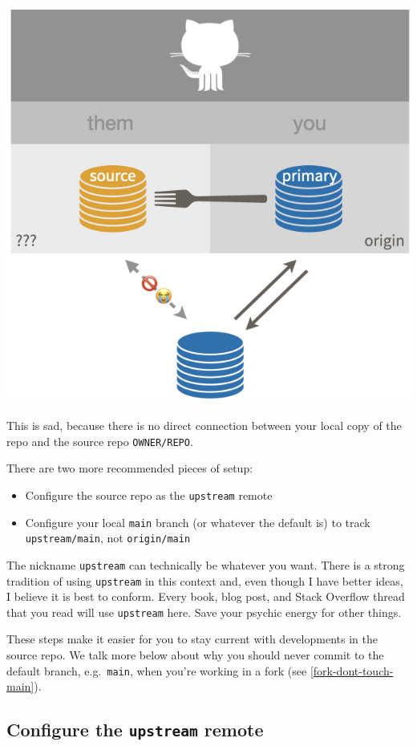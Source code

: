 \documentclass[
]{book}
\providecommand{\tightlist}{%
  \setlength{\itemsep}{0pt}\setlength{\parskip}{0pt}}
\begin{document}
\begin{center}\includegraphics[width=0.6\linewidth]{img/fork-no-upstream-sad} \end{center}

This is sad, because there is no direct connection between your local copy of the repo and the source repo \texttt{OWNER/REPO}.

There are two more recommended pieces of setup:

\begin{itemize}
\tightlist
\item
  Configure the source repo as the \texttt{upstream} remote
\item
  Configure your local \texttt{main} branch (or whatever the default is) to track
  \texttt{upstream/main}, not \texttt{origin/main}
\end{itemize}

The nickname \texttt{upstream} can technically be whatever you want.
There is a strong tradition of using \texttt{upstream} in this context and, even though I have better ideas, I believe it is best to conform.
Every book, blog post, and Stack Overflow thread that you read will use \texttt{upstream} here.
Save your psychic energy for other things.

These steps make it easier for you to stay current with developments in the source repo.
We talk more below about why you should never commit to the default branch, e.g.~\texttt{main}, when you're working in a fork (see \ref{fork-dont-touch-main}).

\subsection{\texorpdfstring{Configure the \texttt{upstream} remote}{Configure the upstream remote}}\label{fork-configure-upstream}
\end{document}
